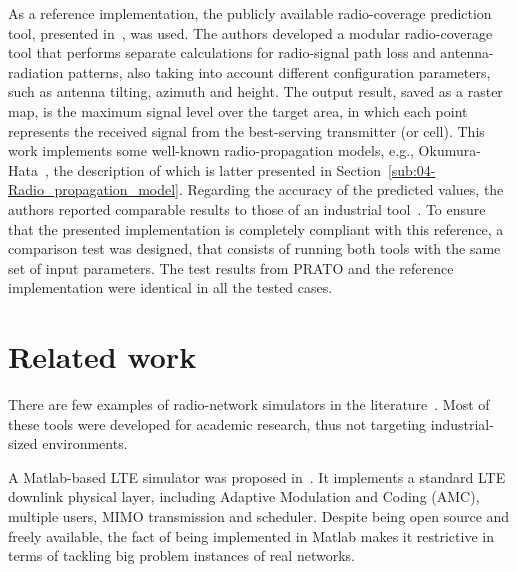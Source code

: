 As a reference implementation, the publicly available radio-coverage
prediction tool, presented in~\cite{Ozimek_Open.source.radio.coverage.prediction:2010},
was used. The authors developed a modular radio-coverage tool that
performs separate calculations for radio-signal path loss and antenna-radiation
patterns, also taking into account different configuration parameters,
such as antenna tilting, azimuth and height. The output result, saved
as a raster map, is the maximum signal level over the target area,
in which each point represents the received signal from the best-serving
transmitter (or cell). This work implements some well-known radio-propagation
models, e.g., Okumura-Hata~\cite{Hata_Empirical_formula_for_propagation_loss_in_land_mobile_radio_services:1980},
the description of which is latter presented in Section~\ref{sub:04-Radio_propagation_model}.
Regarding the accuracy of the predicted values, the authors reported
comparable results to those of an industrial tool~\cite{Ozimek_Open.source.radio.coverage.prediction:2010}.
To ensure that the presented implementation is completely compliant
with this reference, a comparison test was designed, that consists
of running both tools with the same set of input parameters. The test
results from PRATO and the reference implementation were identical
in all the tested cases.






\section{Related work \label{sec:04-Related_work}}

There are few examples of radio-network simulators in the literature~\cite{Ozimek_Open.source.radio.coverage.prediction:2010,Mehlfuhrer_The_Vienna_LTE_Simulators_enabling_reproducibility_in_wireless_communications_research:2011,Pillekeit-A_hybrid_simulation_framework_for_the_evaluation_of_common_RRM:2012,Piro_Simulating_LTE_cellular_systems_an_open_source_framework:2011,Sanchez_Performance_evaluation_of_OFDMA_wireless_systems_using_WM_SIM:2006,Yeung-Detailed_OFDM_modeling_in_network_simulation:2004}.
Most of these tools were developed for academic research, thus not
targeting industrial-sized environments. 

A Matlab-based LTE simulator was proposed in~\cite{Mehlfuhrer_The_Vienna_LTE_Simulators_enabling_reproducibility_in_wireless_communications_research:2011}.
It implements a standard LTE downlink physical layer, including Adaptive
Modulation and Coding (AMC), multiple users, MIMO transmission and
scheduler. Despite being open source and freely available, the fact
of being implemented in Matlab makes it restrictive in terms of tackling
big problem instances of real networks.

